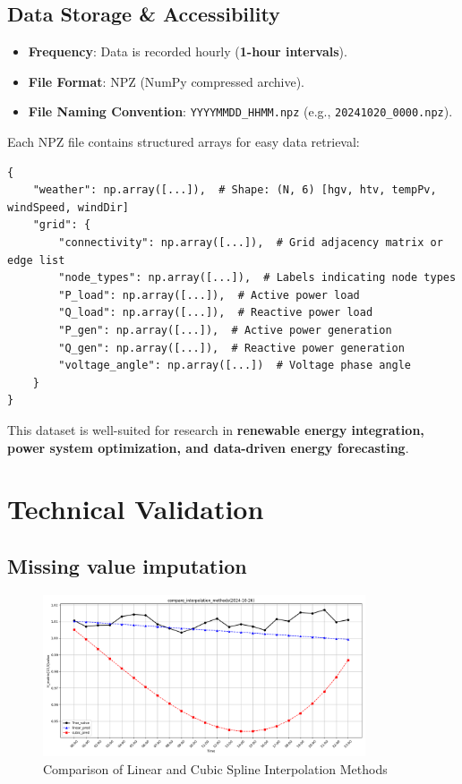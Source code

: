\documentclass[12pt]{article}
\begin{document}
\subsection*{Data Storage \& Accessibility}
\begin{itemize}
    \item \textbf{Frequency}: Data is recorded hourly (\textbf{1-hour intervals}).
    \item \textbf{File Format}: NPZ (NumPy compressed archive).
    \item \textbf{File Naming Convention}: \texttt{YYYYMMDD\_HHMM.npz} (e.g., \texttt{20241020\_0000.npz}).
\end{itemize}
Each NPZ file contains structured arrays for easy data retrieval:

\begin{verbatim}
{
    "weather": np.array([...]),  # Shape: (N, 6) [hgv, htv, tempPv, windSpeed, windDir]
    "grid": {
        "connectivity": np.array([...]),  # Grid adjacency matrix or edge list
        "node_types": np.array([...]),  # Labels indicating node types
        "P_load": np.array([...]),  # Active power load
        "Q_load": np.array([...]),  # Reactive power load
        "P_gen": np.array([...]),  # Active power generation
        "Q_gen": np.array([...]),  # Reactive power generation
        "voltage_angle": np.array([...])  # Voltage phase angle
    }
}
\end{verbatim}

This dataset is well-suited for research in \textbf{renewable energy integration, power system optimization, and data-driven energy forecasting}.


\section*{Technical Validation}
\subsection*{Missing value imputation}
\begin{figure}[htbp]
    \centering
    \includegraphics[width=0.85\textwidth]{picture/interpolation.png}
    \caption{Comparison of Linear and Cubic Spline Interpolation Methods}
    \label{fig:interpolation_comparison_en}
\end{figure}
\end{document}

